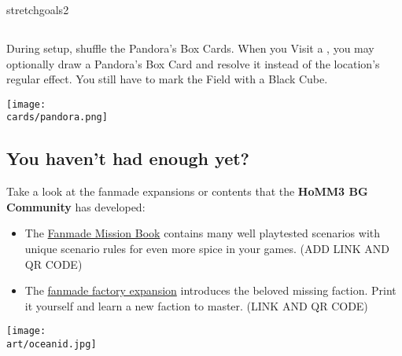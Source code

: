 \begin{multicols*}{2}
\begin{expansion}{stretchgoals2}
  \subsection*{}
  During setup, shuffle the Pandora's Box Cards.
  When you Visit a , you may optionally draw a Pandora's Box Card and resolve it instead of the location's regular effect.
  You still have to mark the Field with a Black Cube.

  \medskip
  \begin{center}
    \texttt{[image: \\cards/pandora.png]}
  \end{center}
\end{expansion}

\vspace*{1em}
\subsection*{You haven't had enough yet?}
Take a look at the fanmade expansions or contents that the \textbf{HoMM3 BG Community} has developed:
  \begin{itemize}
    \item The \href{https://github.com/qwrtln/Homm3BG-mission-book}{Fanmade Mission Book} contains many well playtested scenarios with unique scenario rules for even more spice in your games. (ADD LINK AND QR CODE)
	\item The \href{https://github.com/piotrbruzda/Homm3BG-FactoryRulebook}{fanmade factory expansion} introduces the beloved missing faction. Print it yourself and learn a new faction to master. (LINK AND QR CODE)
  \end{itemize}



\columnbreak

\texttt{[image: \\art/oceanid.jpg]}

\end{multicols*}
